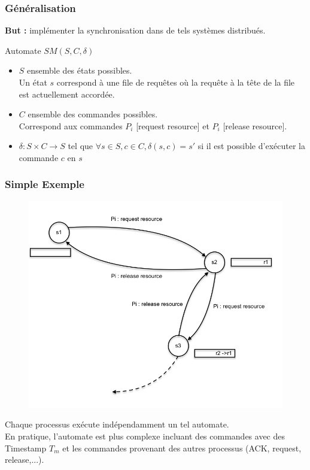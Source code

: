\documentclass[compress]{beamer}
\begin{document}
\begin{frame}
\frametitle{Généralisation}
\textbf{\color{cyan} But : }implémenter la synchronisation dans de tels systèmes distribués.\\
\begin{block}{Automate $SM(S, C, \delta)$}
\begin{itemize}
\item $S$ ensemble des états possibles. \\Un état $s$ correspond à une file de requêtes où la requête à la tête de la file est actuellement accordée.
\item $C$ ensemble des commandes possibles. \\Correspond aux commandes $P_i $ [request resource] et $P_i$ [release resource].
\item $\delta : S \times C \rightarrow S$ tel que $\forall s \in S, c \in C, \delta(s, c) = s'$ si il est possible d'exécuter la commande $c$ en $s$
\end{itemize}
\end{block}
\end{frame}

\begin{frame}
\frametitle{Simple Exemple}
\begin{figure}
	\includegraphics[scale=0.2]{state_machine.png}
\end{figure}
Chaque processus exécute indépendamment un tel automate. \\
En pratique, l'automate est plus complexe incluant des commandes avec des Timestamp $T_m$ et les commandes provenant des autres processus (ACK, request, release,...).
\end{frame}
\end{document}
